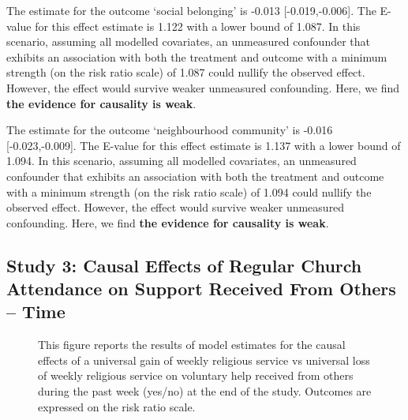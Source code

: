\documentclass[
  single column]{article}
\begin{document}
The estimate for the outcome `social belonging' is -0.013
{[}-0.019,-0.006{]}. The E-value for this effect estimate is 1.122 with
a lower bound of 1.087. In this scenario, assuming all modelled
covariates, an unmeasured confounder that exhibits an association with
both the treatment and outcome with a minimum strength (on the risk
ratio scale) of 1.087 could nullify the observed effect. However, the
effect would survive weaker unmeasured confounding. Here, we find
\textbf{the evidence for causality is weak}.

The estimate for the outcome `neighbourhood community' is -0.016
{[}-0.023,-0.009{]}. The E-value for this effect estimate is 1.137 with
a lower bound of 1.094. In this scenario, assuming all modelled
covariates, an unmeasured confounder that exhibits an association with
both the treatment and outcome with a minimum strength (on the risk
ratio scale) of 1.094 could nullify the observed effect. However, the
effect would survive weaker unmeasured confounding. Here, we find
\textbf{the evidence for causality is weak}.

\newpage{}

\subsection{Study 3: Causal Effects of Regular Church Attendance on
Support Received From Others --
Time}\label{study-3-causal-effects-of-regular-church-attendance-on-support-received-from-others-time}

\begin{figure}


\caption{\label{fig-3_1}This figure reports the results of model
estimates for the causal effects of a universal gain of weekly religious
service vs universal loss of weekly religious service on voluntary help
received from others during the past week (yes/no) at the end of the
study. Outcomes are expressed on the risk ratio scale.}

\end{figure}%
\end{document}
